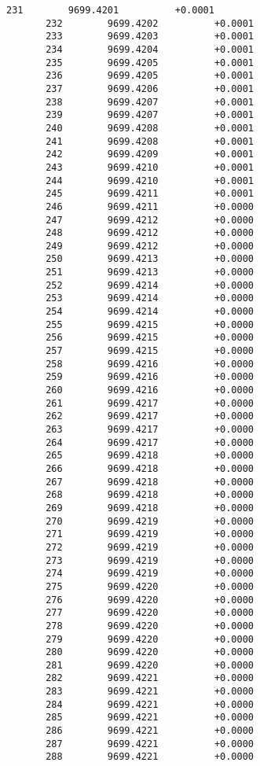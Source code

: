 \documentclass[11pt]{article}
\begin{document}
\begin{Verbatim}[commandchars=\\\{\}]
       231        9699.4201          +0.0001
       232        9699.4202          +0.0001
       233        9699.4203          +0.0001
       234        9699.4204          +0.0001
       235        9699.4205          +0.0001
       236        9699.4205          +0.0001
       237        9699.4206          +0.0001
       238        9699.4207          +0.0001
       239        9699.4207          +0.0001
       240        9699.4208          +0.0001
       241        9699.4208          +0.0001
       242        9699.4209          +0.0001
       243        9699.4210          +0.0001
       244        9699.4210          +0.0001
       245        9699.4211          +0.0001
       246        9699.4211          +0.0000
       247        9699.4212          +0.0000
       248        9699.4212          +0.0000
       249        9699.4212          +0.0000
       250        9699.4213          +0.0000
       251        9699.4213          +0.0000
       252        9699.4214          +0.0000
       253        9699.4214          +0.0000
       254        9699.4214          +0.0000
       255        9699.4215          +0.0000
       256        9699.4215          +0.0000
       257        9699.4215          +0.0000
       258        9699.4216          +0.0000
       259        9699.4216          +0.0000
       260        9699.4216          +0.0000
       261        9699.4217          +0.0000
       262        9699.4217          +0.0000
       263        9699.4217          +0.0000
       264        9699.4217          +0.0000
       265        9699.4218          +0.0000
       266        9699.4218          +0.0000
       267        9699.4218          +0.0000
       268        9699.4218          +0.0000
       269        9699.4218          +0.0000
       270        9699.4219          +0.0000
       271        9699.4219          +0.0000
       272        9699.4219          +0.0000
       273        9699.4219          +0.0000
       274        9699.4219          +0.0000
       275        9699.4220          +0.0000
       276        9699.4220          +0.0000
       277        9699.4220          +0.0000
       278        9699.4220          +0.0000
       279        9699.4220          +0.0000
       280        9699.4220          +0.0000
       281        9699.4220          +0.0000
       282        9699.4221          +0.0000
       283        9699.4221          +0.0000
       284        9699.4221          +0.0000
       285        9699.4221          +0.0000
       286        9699.4221          +0.0000
       287        9699.4221          +0.0000
       288        9699.4221          +0.0000

\end{Verbatim}
\end{document}
